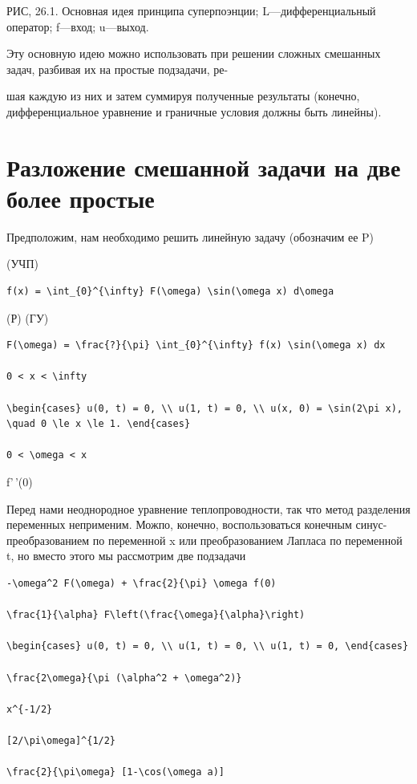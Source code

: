 \documentclass[
  ukrainian,
]{article}
\begin{document}
РИС, 26.1. Основная идея принципа суперпоэнции; L---дифференциальный
оператор; f---вход; u---выход.

Эту основную идею можно использовать при решении сложных смешанных
задач, разбивая их на простые подзадачи, ре-

шая каждую из них и затем суммируя полученные результаты (конечно,
дифференциальное уравнение и граничные условия должны быть линейны).

\section{Разложение смешанной задачи на две более
простые}\label{ux440ux430ux437ux43bux43eux436ux435ux43dux438ux435-ux441ux43cux435ux448ux430ux43dux43dux43eux439-ux437ux430ux434ux430ux447ux438-ux43dux430-ux434ux432ux435-ux431ux43eux43bux435ux435-ux43fux440ux43eux441ux442ux44bux435}

Предположим, нам необходимо решить линейную задачу (обозначим ее P)

(УЧП)

\begin{verbatim}
f(x) = \int_{0}^{\infty} F(\omega) \sin(\omega x) d\omega
\end{verbatim}

(Р) (ГУ)

\begin{verbatim}
F(\omega) = \frac{?}{\pi} \int_{0}^{\infty} f(x) \sin(\omega x) dx

0 < x < \infty

\begin{cases} u(0, t) = 0, \\ u(1, t) = 0, \\ u(x, 0) = \sin(2\pi x), \quad 0 \le x \le 1. \end{cases}

0 < \omega < x
\end{verbatim}

f'\,'(0)

Перед нами неоднородное уравнение теплопроводности, так что метод
разделения переменных неприменим. Можпо, конечно, воспользоваться
конечным синус-преобразованием по переменной x или преобразованием
Лапласа по переменной t, но вместо этого мы рассмотрим две подзадачи

\begin{verbatim}
-\omega^2 F(\omega) + \frac{2}{\pi} \omega f(0)

\frac{1}{\alpha} F\left(\frac{\omega}{\alpha}\right)

\begin{cases} u(0, t) = 0, \\ u(1, t) = 0, \\ u(1, t) = 0, \end{cases}

\frac{2\omega}{\pi (\alpha^2 + \omega^2)}

x^{-1/2}

[2/\pi\omega]^{1/2}

\frac{2}{\pi\omega} [1-\cos(\omega a)]
\end{verbatim}
\end{document}

